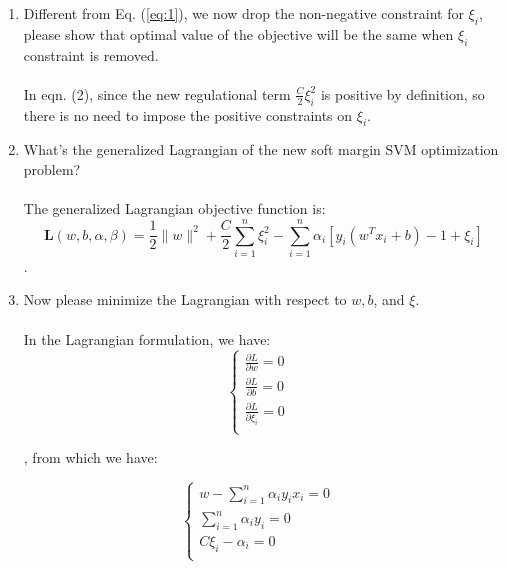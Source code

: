\documentclass[11pt]{article}
\newcommand{\mtx}[1]{\mathbf{#1}}
\def \mL {\mtx{L}}
\begin{document}
\begin{enumerate}
	\item Different from Eq. (\ref{eq:1}), we now drop the non-negative constraint for $\xi_i$, please show that optimal value of the objective will be the same when $\xi_i$ constraint is removed.\\ \\
	In eqn. (2), since the new regulational term $\frac{C}{2}\xi_i^2$ is positive by definition, so there is no need to impose the positive constraints on $\xi_i$.
	\item What's the generalized Lagrangian of the new soft margin SVM optimization problem?\\ \\
	The generalized Lagrangian objective function is: 
	\begin{equation}
		\mL(w,b,\alpha,\beta) = \frac{1}{2}\|w\|^2+\frac{C}{2}\sum_{i=1}^{n}\xi_i^2-\sum_{i=1}^{n}\alpha_i[y_i(w^Tx_i+b)-1+\xi_i]
	\end{equation}
	.
	\item Now please minimize the Lagrangian with respect to $w, b$, and $\xi$.\\ \\
	In the Lagrangian formulation, we have: 
	\begin{equation}
				\begin{cases}
			\frac{\partial L}{\partial w}=0&\\
			\frac{\partial L}{\partial b}=0&\\
			\frac{\partial L}{\partial \xi_i}=0&\\
		\end{cases}
			\end{equation}
	
	, from which we have:
	
	\[
	\begin{cases}
		w-\sum_{i=1}^{n}\alpha_iy_ix_i=0&\\
		\sum_{i=1}^{n}\alpha_iy_i=0&\\
		C\xi_i-\alpha_i=0&\\
	\end{cases}
	\]
	

\end{enumerate}
\end{document}
